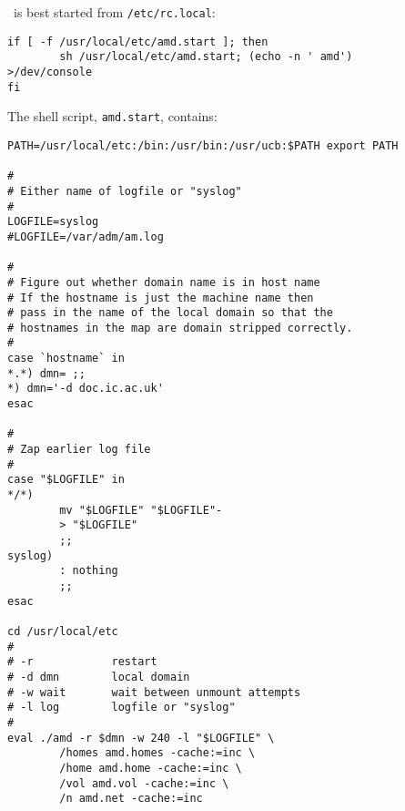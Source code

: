 %
%
%
%



\Amd\ is best started from {\tt /etc/rc.local}:
\begin{verbatim}
if [ -f /usr/local/etc/amd.start ]; then
        sh /usr/local/etc/amd.start; (echo -n ' amd')      >/dev/console
fi
\end{verbatim}
The shell script, {\tt amd.start}, contains:
\begin{verbatim}
PATH=/usr/local/etc:/bin:/usr/bin:/usr/ucb:$PATH export PATH

#
# Either name of logfile or "syslog"
#
LOGFILE=syslog
#LOGFILE=/var/adm/am.log

#
# Figure out whether domain name is in host name
# If the hostname is just the machine name then
# pass in the name of the local domain so that the
# hostnames in the map are domain stripped correctly.
#
case `hostname` in
*.*) dmn= ;;
*) dmn='-d doc.ic.ac.uk'
esac

#
# Zap earlier log file
#
case "$LOGFILE" in
*/*)
        mv "$LOGFILE" "$LOGFILE"-
        > "$LOGFILE"
        ;;
syslog)
        : nothing
        ;;
esac

cd /usr/local/etc
#
# -r            restart
# -d dmn        local domain
# -w wait       wait between unmount attempts
# -l log        logfile or "syslog"
#
eval ./amd -r $dmn -w 240 -l "$LOGFILE" \
        /homes amd.homes -cache:=inc \
        /home amd.home -cache:=inc \
        /vol amd.vol -cache:=inc \
        /n amd.net -cache:=inc
\end{verbatim}

